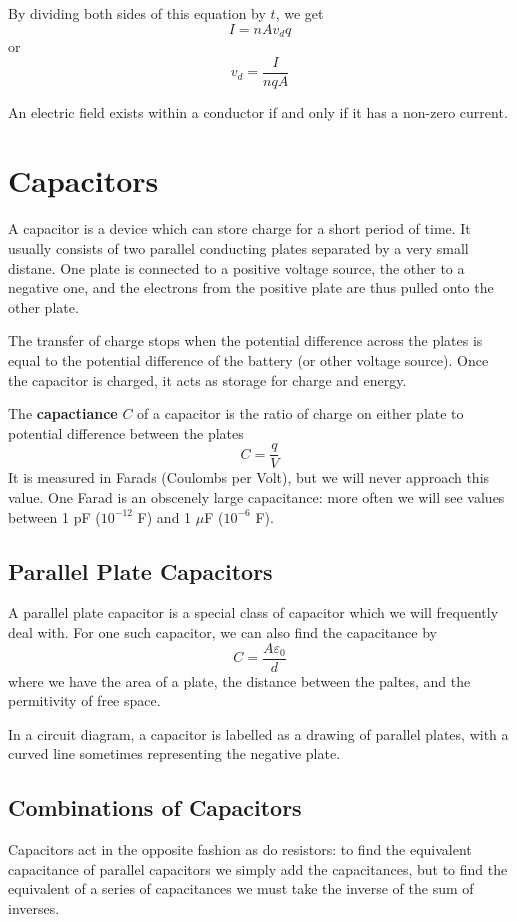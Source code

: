 \documentclass[12pt]{article}
\begin{document}
By dividing both sides of this equation by $t$, we get \[ I = n A v_d q \] or \[ v_d = \frac{I}{n q A} \]

An electric field exists within a conductor if and only if it has a non-zero current.

\section*{Capacitors}
A capacitor is a device which can store charge for a short period of time. It usually consists of two parallel conducting plates separated by a very small distane. One plate is connected to a positive voltage source, the other to a negative one, and the electrons from the positive plate are thus pulled onto the other plate. 

The transfer of charge stops when the potential difference across the plates is equal to the potential difference of the battery (or other voltage source). Once the capacitor is charged, it acts as storage for charge and energy.

The {\bf capactiance} $C$ of a capacitor is the ratio of charge on either plate to potential difference between the plates \[ C = \frac{q}{V} \] It is measured in Farads (Coulombs per Volt), but we will never approach this value. One Farad is an obscenely large capacitance: more often we will see values between 1 pF ($10^{-12}$ F) and 1 $\mu$F ($10^{-6}$ F).

\subsection*{Parallel Plate Capacitors}
A parallel plate capacitor is a special class of capacitor which we will frequently deal with. For one such capacitor, we can also find the capacitance by \[ C = \frac{A \varepsilon_0}{d} \] where we have the area of a plate, the distance between the paltes, and the permitivity of free space.

In a circuit diagram, a capacitor is labelled as a drawing of parallel plates, with a curved line sometimes representing the negative plate.

\subsection*{Combinations of Capacitors}
Capacitors act in the opposite fashion as do resistors: to find the equivalent capacitance of parallel capacitors we simply add the capacitances, but to find the equivalent of a series of capacitances we must take the inverse of the sum of inverses.
\end{document}
